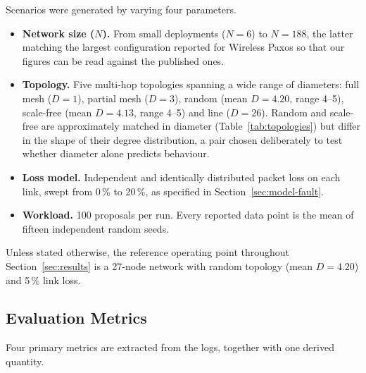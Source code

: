 \documentclass[journal]{IEEEtran}
\newcommand{\Nnodes}{N}                   %
\newcommand{\Diam}{D}                     %
\begin{document}
Scenarios were generated by varying four parameters.

\begin{itemize}
\item \textbf{Network size ($\Nnodes$).} From small deployments
($\Nnodes = 6$) to $\Nnodes = 188$, the latter matching the largest
configuration reported for Wireless Paxos \cite{poirot19paxos} so that
our figures can be read against the published ones.

\item \textbf{Topology.} Five multi-hop topologies spanning a wide range
of diameters: full mesh ($\Diam = 1$), partial mesh ($\Diam = 3$), random
(mean $\Diam = 4.20$, range 4--5), scale-free (mean $\Diam = 4.13$, range 4--5) and line ($\Diam = 26$). Random
and scale-free are approximately matched in diameter (Table~\ref{tab:topologies}) but
differ in the shape of their degree distribution, a pair chosen deliberately
to test whether diameter alone predicts behaviour.

\item \textbf{Loss model.} Independent and identically distributed packet
loss on each link, swept from 0\,\% to 20\,\%, as specified in
Section~\ref{sec:model-fault}.

\item \textbf{Workload.} 100 proposals per run. Every reported data point
is the mean of fifteen independent random seeds.
\end{itemize}

Unless stated otherwise, the reference operating point throughout
Section~\ref{sec:results} is a 27-node network with random topology
(mean $\Diam = 4.20$) and 5\,\% link loss.

\subsection{Evaluation Metrics}
\label{sec:method-metrics}

Four primary metrics are extracted from the logs, together with one
derived quantity.
\end{document}
